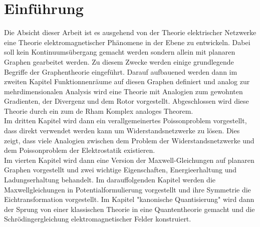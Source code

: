 \documentclass[11pt,a4paper,leqno]{report}
\numberwithin{equation}{chapter}
\begin{document}
\chapter*{Einf\"uhrung}
Die Absicht dieser Arbeit ist es ausgehend von der Theorie elektrischer Netzwerke eine Theorie elektromagnetischer Ph\"anomene in der Ebene zu entwickeln. Dabei soll kein Kontinuums\"ubergang gemacht werden sondern allein mit planaren Graphen gearbeitet werden. Zu diesem Zwecke werden einige grundlegende Begriffe der Graphentheorie eingef\"uhrt. Darauf aufbauened werden dann im zweiten Kapitel Funktionnenr\"aume auf diesen Graphen definiert und analog zur mehrdimensionalen Analysis wird eine Theorie mit Analogien zum gewohnten Gradienten, der Divergenz und dem Rotor vorgestellt. Abgeschlossen wird diese Theorie durch ein zum de Rham Komplex analoges Theorem. \\Im dritten Kapitel wird dann ein verallgemeinertes Poissonproblem vorgestellt, dass direkt verwendet werden kann um Widerstandsnetzwerke zu l\"osen. Dies zeigt, dass viele Analogien zwischen dem Problem der Widerstandsnetzwerke und dem Poissonproblem der Elektrostatik existieren.\\
Im vierten Kapitel wird dann eine Version der Maxwell-Gleichungen auf planaren Graphen vorgestellt und zwei wichtige Eigenschaften, Energieerhaltung und Ladungserhaltung behandelt.
Im darauffolgenden Kapitel werden die Maxwellgleichungen in Potentialformulierung vorgestellt und ihre Symmetrie die Eichtransformation vorgestellt.
Im Kapitel "kanonische Quantisierung" wird dann der Sprung von einer klassischen Theorie in eine Quantentheorie gemacht und die Schr\"odingergleichung elektromagnetischer Felder konstruiert.
\end{document}
